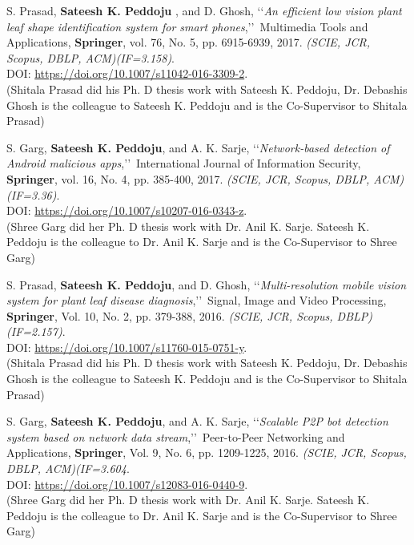 \begin{etaremune}
	\item
	S. Prasad, \textbf{Sateesh K. Peddoju} , and D. Ghosh, \lq\lq \textit{An efficient low vision plant leaf shape identification system for smart phones},\rq\rq\, Multimedia Tools and Applications, \textbf{Springer}, vol. 76, No. 5, pp. 6915-6939, 2017. \emph{(SCIE, JCR, Scopus, DBLP, ACM)(IF=3.158)}. \\DOI: \url{https://doi.org/10.1007/s11042-016-3309-2}.  \\(Shitala Prasad did his Ph. D thesis work with Sateesh K. Peddoju, Dr. Debashis Ghosh is the colleague to Sateesh K. Peddoju and is the Co-Supervisor to Shitala Prasad)
	
	\item
	S. Garg, \textbf{Sateesh K. Peddoju}, and A. K. Sarje, \lq\lq \textit{Network-based detection of Android malicious apps},\rq\rq\, International Journal of Information Security, \textbf{Springer}, vol. 16, No. 4, pp. 385-400, 2017. \emph{(SCIE, JCR, Scopus, DBLP, ACM)(IF=3.36)}. \\DOI: \url{https://doi.org/10.1007/s10207-016-0343-z}. \\(Shree Garg did her Ph. D thesis work with Dr. Anil K. Sarje.  Sateesh K. Peddoju is the colleague to Dr. Anil K. Sarje and is the Co-Supervisor to Shree Garg)
	
	\item
	S. Prasad, \textbf{Sateesh K. Peddoju}, and D. Ghosh, \lq\lq \textit{Multi-resolution mobile vision system for plant leaf disease diagnosis},\rq\rq\, Signal, Image and Video Processing, \textbf{Springer}, Vol. 10, No. 2, pp. 379-388, 2016. \emph{(SCIE, JCR,  Scopus, DBLP)(IF=2.157)}. \\DOI: \url{https://doi.org/10.1007/s11760-015-0751-y}.  \\(Shitala Prasad did his Ph. D thesis work with Sateesh K. Peddoju, Dr. Debashis Ghosh is the colleague to Sateesh K. Peddoju and is the Co-Supervisor to Shitala Prasad)
	
	\item
	S. Garg, \textbf{Sateesh K. Peddoju}, and A. K. Sarje, \lq\lq \textit{Scalable P2P bot detection system based on network data stream},\rq\rq\, Peer-to-Peer Networking and Applications, \textbf{Springer}, Vol. 9, No. 6, pp. 1209-1225, 2016. \emph{(SCIE, JCR, Scopus, DBLP, ACM)(IF=3.604}. \\DOI: \url{https://doi.org/10.1007/s12083-016-0440-9}. \\(Shree Garg did her Ph. D thesis work with Dr. Anil K. Sarje.  Sateesh K. Peddoju is the colleague to Dr. Anil K. Sarje and is the Co-Supervisor to Shree Garg)
	

\end{etaremune}
